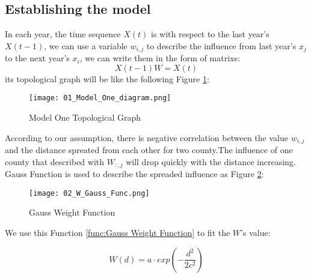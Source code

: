 \documentclass{mcmthesis}
\begin{document}
	\subsection{Establishing the model}
	\par In each year, the time sequence $X(t)$ is with respect to the last year's $X(t-1)$, we can use a variable $w_{i, j}$ to describe the influence from last year's $x_{j}$ to the next year's $x_{i}$,
	we can write them in the form of matrixs:
		$$ X(t-1)W = X(t) $$
	its topological graph will be like the following Figure \ref{fig:Topological Graph of Model One}:
		\begin{figure}[h]
			\texttt{[image: 01\_Model\_One\_diagram.png]}
			\centering
			\caption{Model One Topological Graph} \label{fig:Topological Graph of Model One}
		\end{figure}
	\par According to our assumption, there is negative correlation between the value $w_{i, j}$ and the distance spreated from each other for two county.The influence of one county that described with $W_{:, j}$ will drop quickly with the distance increasing. Gauss Function is used to describe the spreaded influence as Figure \ref{fig:Gauss Weight Function}:
		\begin{figure}
			\texttt{[image: 02\_W\_Gauss\_Func.png]}
			\centering
			\caption{Gauss Weight Function} \label{fig:Gauss Weight Function}
		\end{figure}
	\par We use this Function \ref{func:Gauss Weight Function} to fit the $W$'s value:
		
		$$W(d)= a \cdot exp(-\frac{d^2}{2c^2}) \label{func:Gauss Weight Function}$$
\end{document}
